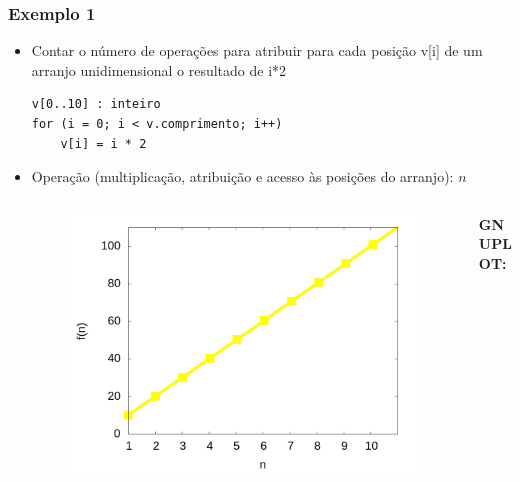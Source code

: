 \documentclass[aspectratio=169]{beamer}
\begin{document}
\begin{frame}[fragile]\frametitle{Exemplo 1}
\begin{itemize}
	\item Contar o número de operações para atribuir para cada posição v[i] de um arranjo unidimensional o resultado de i*2
\begin{verbatim}
v[0..10] : inteiro
for (i = 0; i < v.comprimento; i++)
    v[i] = i * 2
\end{verbatim}
	\pause
	\item Operação (multiplicação, atribuição e acesso às posições do arranjo): \textbf{$n$}
	\pause
\vspace{-3mm}
\begin{columns}[T]
\begin{column}{0.6\linewidth}
\begin{figure}[h]
	\centering
	\includegraphics[height=0.4\paperheight]{graficos/10n.jpg}
\end{figure}
\end{column}
\begin{column}{0.4\linewidth}
\vspace{5mm}
{\fontsize{0}{4}\selectfont{}\textbf{GNUPLOT:}

}
\end{column}
\end{columns}
\end{itemize}
\end{frame}
\end{document}
